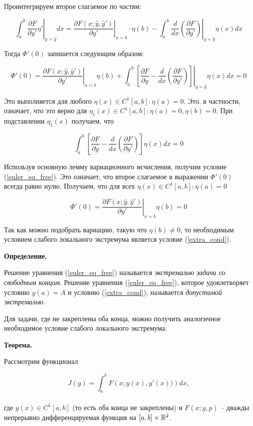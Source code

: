 Проинтегрируем второе слагаемое по частям:

$$
\left. \int_a^b \frac{\partial F}{\partial y'} \eta' 
\right|_{y = \widehat{y}} dx = 
\left. \frac{\partial F(x; \widehat{y}, \widehat{y}')}{\partial y'} 
\right|_{x = b} \cdot \eta(b) - 
\left. \int_a^b \frac{d}{dx} \left(
\frac{\partial F}{\partial y'}
\right) \right|_{y = \widehat{y}} \eta(x) dx
$$

Тогда $\Phi'(0)$ запишется следующим образом:

$$
\Phi'(0) = \left. 
\frac{\partial F(x; \widehat{y}, \widehat{y}')}{\partial y'}
\right|_{x = b} \eta(b) + \left. \int_a^b \left[
\frac{\partial F}{\partial y} - 
\frac{d}{dx} \left( \frac{\partial F}{\partial y'} \right) 
\right] \right|_{y = \widehat{y}} \eta(x) dx = 0
$$

Это выполняется для любого $\eta(x) \in C^1 [a, b] : \eta(a) = 0$.
Это, в частности, означает, что это верно для 
$\eta_1(x) \in C^1 [a, b] : \eta(a) = 0, \eta(b) = 0$. При подставлении
$\eta_1(x)$ получаем, что 

$$
\int_a^b \left[
\frac{\partial F}{\partial y} - 
\frac{d}{dx} \left( \frac{\partial F}{\partial y'} \right) 
\right] \eta(x) dx = 0
$$

Используя основную лемму вариационного исчисления, получим условие 
(\ref{euler_eq_free}). Это означает, что второе слагаемое в выражении 
$\Phi'(0)$ всегда равно нулю. Получаем, что для всех
$\eta(x) \in C^1 [a, b] : \eta(a) = 0$

$$
\Phi'(0) = \left. 
\frac{\partial F(x; \widehat{y}, \widehat{y}')}{\partial y'}
\right|_{x = b} \eta(b) = 0
$$

Так как можно подобрать вариацию, такую что $\eta(b) \neq 0$, то 
необходимым условием слабого локального экстремума является 
условие (\ref{extra_cond}).
\pagebreak

\textbf{Определение.}

Решение уравнения (\ref{euler_eq_free}) называется
\textit{экстремалью задачи со свободным концом}.
Решение уравнения (\ref{euler_eq_free}), которое удовлетворяет
условию $y(a) = A$ и условию (\ref{extra_cond}), называется
\textit{допустимой экстремалью}.

Для задачи, где не закреплены оба конца, можно получить 
аналогичное необходимое условие слабого локального экстремума:

\textbf{Теорема.}

Рассмотрим функционал 

\begin{equation*}
J(y) = \int_a^b F \left( x; y(x), y'(x)) \right) dx,
\end{equation*}
\\
где $y(x) \in C^1 [a, b]$ (то есть оба конца не закреплены) и
$F \left( x; y, p \right)$ -- дважды непрерывно дифференцируемая
функция на $[a, b] \times \mathbb{R}^2$.

